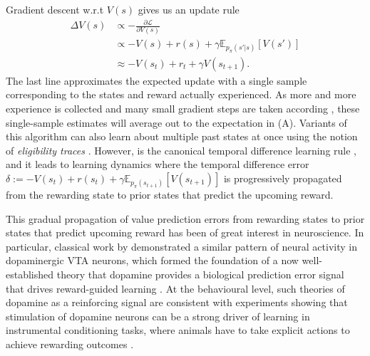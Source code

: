 Gradient descent w.r.t $V(s)$ gives us an update rule
\begin{align}
    \Delta V(s) &\propto - \frac{\partial \mathcal{L}}{\partial V(s)}\\
    \label{eq:TD-learning_exp}
    &\propto - V(s) + r(s) + \gamma \mathbb{E}_{p_\pi(s'|s)} \left [ V(s') \right ]\\
    \label{eq:TD-learning}
    &\approx - V(s_t) + r_t + \gamma V(s_{t+1}).
\end{align}
The last line approximates the expected update with a single sample corresponding to the states and reward actually experienced.
As more and more experience is collected and many small gradient steps are taken according , these single-sample estimates will average out to the expectation in  (A).
Variants of this algorithm can also learn about multiple past states at once using the notion of \emph{eligibility traces} \citep{sutton2018reinforcement}.
However,  is the canonical temporal difference learning rule \citep{sutton1988learning}, and it leads to learning dynamics where the temporal difference error $\delta := - V(s_t) + r(s_t) + \gamma \mathbb{E}_{p_\pi(s_{t+1})} \left [ V(s_{t+1}) \right ]$ is progressively propagated from the rewarding state to prior states that predict the upcoming reward.

This gradual propagation of value prediction errors from rewarding states to prior states that predict upcoming reward has been of great interest in neuroscience.
In particular, classical work by \citet{schultz1997neural} demonstrated a similar pattern of neural activity in dopaminergic VTA neurons, which formed the foundation of a now well-established theory that dopamine provides a biological prediction error signal that drives reward-guided learning \citep{niv2009reinforcement}.
At the behavioural level, such theories of dopamine as a reinforcing signal are consistent with experiments showing that stimulation of dopamine neurons can be a strong driver of learning in instrumental conditioning tasks, where animals have to take explicit actions to achieve rewarding outcomes \citep{olds1954positive, tsai2009phasic}.



